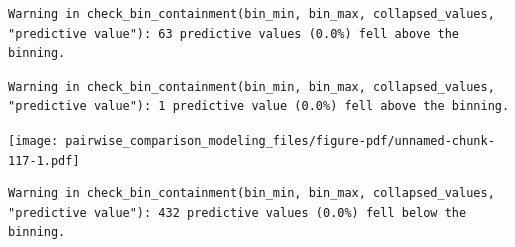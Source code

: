 \documentclass[
  letterpaper,
  DIV=11,
  numbers=noendperiod]{scrartcl}
\newenvironment{Shaded}{\begin{snugshade}}{\end{snugshade}}
\newcommand{\AttributeTok}[1]{\textcolor[rgb]{0.40,0.45,0.13}{#1}}
\newcommand{\DecValTok}[1]{\textcolor[rgb]{0.68,0.00,0.00}{#1}}
\newcommand{\FunctionTok}[1]{\textcolor[rgb]{0.28,0.35,0.67}{#1}}
\newcommand{\NormalTok}[1]{\textcolor[rgb]{0.00,0.23,0.31}{#1}}
\newcommand{\SpecialCharTok}[1]{\textcolor[rgb]{0.37,0.37,0.37}{#1}}
\newcommand{\StringTok}[1]{\textcolor[rgb]{0.13,0.47,0.30}{#1}}
\begin{document}
\begin{verbatim}
Warning in check_bin_containment(bin_min, bin_max, collapsed_values,
"predictive value"): 63 predictive values (0.0%) fell above the binning.
\end{verbatim}

\begin{Shaded}
\end{Shaded}

\begin{verbatim}
Warning in check_bin_containment(bin_min, bin_max, collapsed_values,
"predictive value"): 1 predictive value (0.0%) fell above the binning.
\end{verbatim}

\texttt{[image: pairwise\_comparison\_modeling\_files/figure-pdf/unnamed-chunk-117-1.pdf]}

\begin{Shaded}
\end{Shaded}

\begin{verbatim}
Warning in check_bin_containment(bin_min, bin_max, collapsed_values,
"predictive value"): 432 predictive values (0.0%) fell below the binning.
\end{verbatim}
\end{document}
